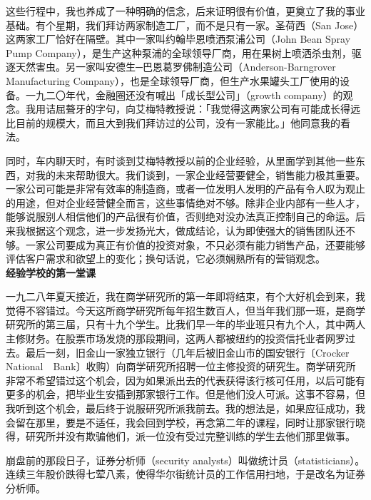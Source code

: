 \documentclass[UTF8,a4paper,zihao=-4,fontset = windows]{ctexart} %
\begin{document}
这些行程中，我也养成了一种明确的信念，后来证明很有价值，更奠立了我的事业基础。有个星期，我们拜访两家制造工厂，而不是只有一家。圣荷西（San Jose）这两家工厂恰好在隔壁。其中一家叫约翰毕恩喷洒泵浦公司（John Bean Spray Pump Company），是生产这种泵浦的全球领导厂商，用在果树上喷洒杀虫剂，驱逐天然害虫。另一家叫安德生─巴恩葛罗佛制造公司（Anderson-Barngrover Manufacturing Company），也是全球领导厂商，但生产水果罐头工厂使用的设备。一九二〇年代，金融圈还没有喊出「成长型公司」（growth company）的观念。我用诘屈聱牙的字句，向艾梅特教授说：「我觉得这两家公司有可能成长得远比目前的规模大，而且大到我们拜访过的公司，没有一家能比。」他同意我的看法。

同时，车内聊天时，有时谈到艾梅特教授以前的企业经验，从里面学到其他一些东西，对我的未来帮助很大。我们谈到，一家企业经营要健全，销售能力极其重要。一家公司可能是非常有效率的制造商，或者一位发明人发明的产品有令人叹为观止的用途，但对企业经营健全而言，这些事情绝对不够。除非企业内部有一些人才，能够说服别人相信他们的产品很有价值，否则绝对没办法真正控制自己的命运。后来我根据这个观念，进一步发扬光大，做成结论，认为即使强大的销售团队还不够。一家公司要成为真正有价值的投资对象，不只必须有能力销售产品，还要能够评估客户需求和欲望上的变化；换句话说，它必须娴熟所有的营销观念。
\\

\textbf{经验学校的第一堂课}


一九二八年夏天接近，我在商学研究所的第一年即将结束，有个大好机会到来，我觉得不容错过。今天这所商学研究所每年招生数百人，但当年我们那一班，是商学研究所的第三届，只有十九个学生。比我们早一年的毕业班只有九个人，其中两人主修财务。在股票市场发烧的那段期间，这两人都被纽约的投资信托业者网罗过去。最后一刻，旧金山一家独立银行（几年后被旧金山市的国安银行〔Crocker National　Bank〕收购）向商学研究所招聘一位主修投资的研究生。商学研究所非常不希望错过这个机会，因为如果派出去的代表获得该行核可任用，以后可能有更多的机会，把毕业生安插到那家银行工作。但是他们没人可派。这事不容易，但我听到这个机会，最后终于说服研究所派我前去。我的想法是，如果应征成功，我会留在那里，要是不适任，我会回到学校，再念第二年的课程，同时让那家银行晓得，研究所并没有欺骗他们，派一位没有受过完整训练的学生去他们那里做事。

崩盘前的那段日子，证券分析师（security analysts）叫做统计员（statisticians）。连续三年股价跌得七荤八素，使得华尔街统计员的工作信用扫地，于是改名为证券分析师。
\end{document}
